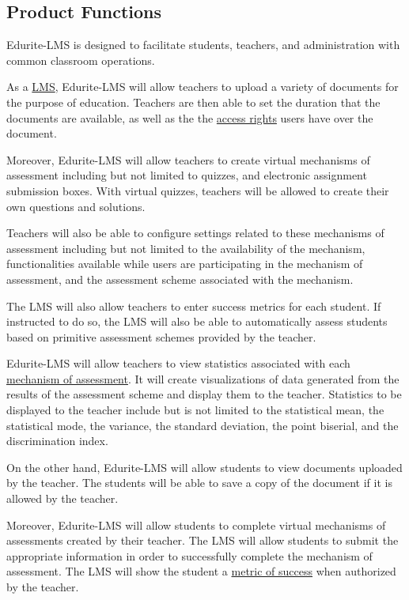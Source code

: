 \documentclass[]{article}
\begin{document}

\subsection{Product Functions}
\label{sub:product_functions}
Edurite-LMS is designed to facilitate students, teachers, and administration
with common classroom operations.

As a \underline{LMS}, Edurite-LMS will allow teachers to upload a variety of documents for
the purpose of education. Teachers are then able to set the duration that the
documents are available, as well as the the \underline{access rights} users
have over the document.

Moreover, Edurite-LMS will allow teachers to create virtual mechanisms of
assessment including but not limited to quizzes, and electronic assignment
submission boxes. With virtual quizzes, teachers will be allowed to create their
own questions and solutions.

Teachers will also be able to configure settings related to these mechanisms of
assessment including but not limited to the availability of the mechanism,
functionalities available while users are participating in the mechanism of
assessment, and the assessment scheme associated with the mechanism.

The LMS will also allow teachers to enter success metrics for each student. If
instructed to do so, the LMS will also be able to automatically assess students
based on primitive assessment schemes provided by the teacher.

Edurite-LMS will allow teachers to view statistics associated with each
\underline{mechanism of assessment}. It will create visualizations of data generated from
the results of the assessment scheme and display them to the teacher. Statistics
to be displayed to the teacher include but is not limited to the statistical
mean, the statistical mode, the variance, the standard deviation, the point
biserial, and the discrimination index.

On the other hand, Edurite-LMS will allow students to view documents uploaded by
the teacher. The students will be able to save a copy of the document if it is
allowed by the teacher.

Moreover, Edurite-LMS will allow students to complete virtual mechanisms of
assessments created by their teacher. The LMS will allow students to submit the
appropriate information in order to successfully complete the mechanism of
assessment. The LMS will show the student a \underline{metric of success} when
authorized by the teacher.
\end{document}

